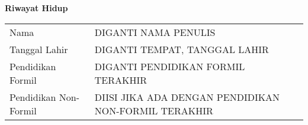 
\newpage %

\begin{center}
\begin{large}
\textbf{Riwayat Hidup}\\
\end{large}
\end{center}
\vspace{5mm}

\begin{tabular}{ll}
Nama&
DIGANTI NAMA PENULIS\tabularnewline
Tanggal Lahir&
DIGANTI TEMPAT, TANGGAL LAHIR\tabularnewline
Pendidikan Formil&
DIGANTI PENDIDIKAN FORMIL TERAKHIR\tabularnewline
Pendidikan Non-Formil&
DIISI JIKA ADA DENGAN PENDIDIKAN NON-FORMIL TERAKHIR\tabularnewline
\end{tabular}

